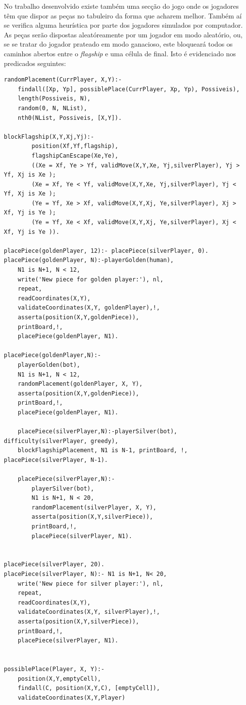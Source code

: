 \documentclass[a4paper]{article}
\begin{document}
No trabalho desenvolvido existe também uma secção do jogo onde os jogadores têm que dispor as peças no tabuleiro da forma que acharem melhor. Também aí se verifica alguma heurística por parte dos jogadores simulados por computador. As peças serão dispostas aleatóreamente por um jogador em modo aleatório, ou, se se tratar do jogador prateado em modo ganacioso, este bloqueará todos os caminhos abertos entre o \textit{flagship} e uma célula de final. Isto é evidenciado nos predicados seguintes:

\begin{verbatim}
randomPlacement(CurrPlayer, X,Y):-
	findall([Xp, Yp], possiblePlace(CurrPlayer, Xp, Yp), Possiveis),
	length(Possiveis, N),
	random(0, N, NList),
	nth0(NList, Possiveis, [X,Y]).

blockFlagship(X,Y,Xj,Yj):-
		position(Xf,Yf,flagship),
		flagshipCanEscape(Xe,Ye),
		((Xe = Xf, Ye > Yf, validMove(X,Y,Xe, Yj,silverPlayer), Yj > Yf, Xj is Xe );
		(Xe = Xf, Ye < Yf, validMove(X,Y,Xe, Yj,silverPlayer), Yj < Yf, Xj is Xe );
		(Ye = Yf, Xe > Xf, validMove(X,Y,Xj, Ye,silverPlayer), Xj > Xf, Yj is Ye );
		(Ye = Yf, Xe < Xf, validMove(X,Y,Xj, Ye,silverPlayer), Xj < Xf, Yj is Ye )).

placePiece(goldenPlayer, 12):- placePiece(silverPlayer, 0).
placePiece(goldenPlayer, N):-playerGolden(human),
	N1 is N+1, N < 12,
	write('New piece for golden player:'), nl,
	repeat,
	readCoordinates(X,Y),
	validateCoordinates(X,Y, goldenPlayer),!,
	asserta(position(X,Y,goldenPiece)),
	printBoard,!,
	placePiece(goldenPlayer, N1).

placePiece(goldenPlayer,N):-
	playerGolden(bot),
	N1 is N+1, N < 12,
	randomPlacement(goldenPlayer, X, Y),
	asserta(position(X,Y,goldenPiece)),
	printBoard,!,
	placePiece(goldenPlayer, N1).

	placePiece(silverPlayer,N):-playerSilver(bot), difficulty(silverPlayer, greedy),
	blockFlagshipPlacement, N1 is N-1, printBoard, !, placePiece(silverPlayer, N-1).

	placePiece(silverPlayer,N):-
		playerSilver(bot),
		N1 is N+1, N < 20,
		randomPlacement(silverPlayer, X, Y),
		asserta(position(X,Y,silverPiece)),
		printBoard,!,
		placePiece(silverPlayer, N1).


placePiece(silverPlayer, 20).
placePiece(silverPlayer, N):- N1 is N+1, N< 20,
	write('New piece for silver player:'), nl,
	repeat,
	readCoordinates(X,Y),
	validateCoordinates(X,Y, silverPlayer),!,
	asserta(position(X,Y,silverPiece)),
	printBoard,!,
	placePiece(silverPlayer, N1).


possiblePlace(Player, X, Y):-
	position(X,Y,emptyCell),
	findall(C, position(X,Y,C), [emptyCell]),
	validateCoordinates(X,Y,Player)
\end{verbatim}
\end{document}
